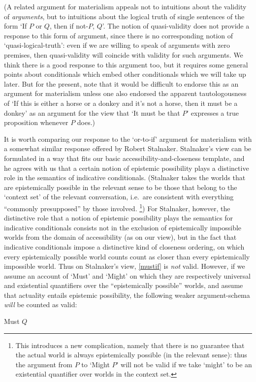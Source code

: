 \documentclass[If.tex]{subfiles}
\begin{document}
\begin{prop}
(A related argument for materialism appeals not to intuitions about the validity of \emph{arguments}, but to intuitions about the logical truth of single sentences of the form ‘If $P$ or $Q$, then if not-$P$, $Q$’. The notion of quasi-validity does not provide a response to this form of argument, since there is no corresponding notion of ‘quasi-logical-truth’: even if we are willing to speak of arguments with zero premises, then quasi-validity will coincide with validity for such arguments. We think there is a good response to this argument too, but it requires some general points about conditionals which embed other conditionals which we will take up later.  
But for the present, note that it would be difficult to endorse this as an argument for materialism unless one also endorsed the apparent tautologousness of ‘If this is either a horse or a donkey and it's not a horse, then it must be a donkey’ as an argument for the view that ‘It must be that $P$’ expresses a true proposition whenever $P$ does.)

It is worth comparing our response to the ‘or-to-if’ argument for materialism with a somewhat similar response offered by Robert Stalnaker.  Stalnaker's view can be formulated in a way that fits our basic accessibility-and-closeness template, and he agrees with us that a certain notion of epistemic possibility plays a distinctive role in the semantics of indicative conditionals.  (Stalnaker takes the worlds that are epistemically possible in the relevant sense to be those that belong to the ‘context set’ of the relevant conversation, i.e.\ are consistent with everything “commonly presupposed” by those involved.%
\footnote{This introduces a new complication, namely that there is no guarantee that the actual world is always epistemically possible (in the relevant sense): thus the argument from $P$ to ‘Might $P$’ will not be valid if we take ‘might’ to be an existential quantifier over worlds in the context set.})
For Stalnaker, however, the distinctive role that a notion of epistemic possibility plays the semantics for indicative conditionals consists not in the exclusion of epistemically impossible worlds from the domain of accessibility (as on our view), but in the fact that indicative conditionals impose a distinctive kind of closeness ordering, on which every epistemically possible world counts count as closer than every epistemically impossible world.  Thus on Stalnaker's view, \ref{mustif} is \emph{not} valid.  However, if we assume an account of ‘Must’ and ‘Might’ on which they are respectively universal and existential quantifiers over the “epistemically possible” worlds, and assume that actuality entails epistemic possibility, the following weaker argument-schema \emph{will} be counted as valid:
\begin{prop}
	 \label{mustmightif}
	Must $Q$
	

\end{prop}
\end{prop}
\end{document}

